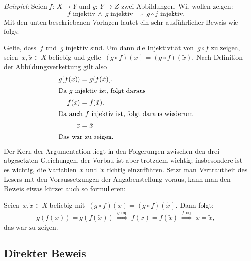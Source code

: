 \documentclass[12pt,a4paper,ngerman]{scrartcl}
\newenvironment{indentblock}{%
  \list{}{\leftmargin\leftmargin}%
  \item\relax
}{%
  \endlist
}
\theoremstyle{definition}
\theoremstyle{plain}
\theoremstyle{remark}
\begin{document}
\emph{Beispiel:} Seien $f{:}\, X \to Y$ und $g{:}\, Y \to Z$ zwei Abbildungen. Wir
wollen zeigen:
\[ \text{$f$ injektiv} \,\wedge\, \text{$g$ injektiv} \ \Longrightarrow\ 
  \text{$g \circ f$ injektiv}. \]
Mit den unten beschriebenen Vorlagen lautet ein sehr ausführlicher Beweis wie
folgt:
\begin{indentblock}
Gelte, dass~$f$ und~$g$ injektiv sind. Um dann die Injektivität von~$g
\circ f$ zu zeigen, seien~$x, \tilde x \in X$
beliebig und gelte~$(g \circ f)(x) = (g \circ f)(\tilde x)$. Nach Definition
der Abbildungsverkettung gilt also
\begin{align*}g(f(x)) &= g(f(\tilde x)). \\
\intertext{Da $g$ injektiv ist, folgt daraus}
f(x) &= f(\tilde x). \\
\intertext{Da auch $f$ injektiv ist, folgt daraus wiederum}
x &= \tilde x. \\
\intertext{Das war zu zeigen.}\end{align*}
\end{indentblock}
\vspace{-2em}
Der Kern der Argumentation liegt in den Folgerungen zwischen den drei
abgesetzten Gleichungen, der Vorbau ist aber trotzdem wichtig; insbesondere ist
es wichtig, die Variablen~$x$ und~$\tilde x$ richtig einzuführen.
Setzt man Vertrautheit des Lesers mit den Voraussetzungen der
Angabenstellung voraus, kann man den Beweis etwas kürzer auch so formulieren:
\begin{indentblock}
Seien~$x, \tilde x \in X$ beliebig mit~$(g \circ f)(x) = (g \circ f)(\tilde
x)$. Dann folgt:
\[ g(f(x)) = g(f(\tilde x)) \ \stackrel{\text{$g$ inj.}}{\Longrightarrow}\ 
   f(x) = f(\tilde x) \ \stackrel{\text{$f$ inj.}}{\Longrightarrow}\ 
   x = \tilde x, \]
das war zu zeigen.
\end{indentblock}

\newpage

\subsection*{Direkter Beweis}
\end{document}
